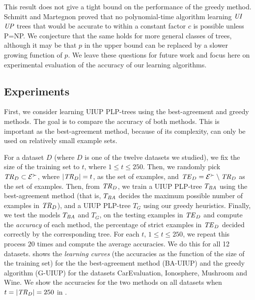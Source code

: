 This result does not give a tight bound on the performance of the greedy 
method. Schmitt and Martegnon \cite{schmitt2006complexity} proved that no
polynomial-time algorithm learning $\textit{UI}$$\textit{UP}$ trees that would be accurate 
to within a constant factor $c$ is possible unless P=NP. We conjecture that
the same holds for more general classes of trees, although it may be that
$p$ in the upper bound can be replaced by a slower growing function of $p$.   
We leave these questions for future work and focus here on experimental
evaluation of the accuracy of our learning algorithms.


\subsection{Experiments}
\label{sec:exp_trees}
First, we consider learning UIUP PLP-trees using the 
best-agreement and greedy methods. The goal is to compare the accuracy of
both methods. This is important as the best-agreement method, because of 
its complexity, can only be used on relatively small example sets. 

For a dataset $D$ (where $D$ is one of the twelve datasets we studied),
we fix the size of the training set to $t$, where $1\leq t\leq 250$. 
Then, we randomly pick $\mathit{TR}_D \subset \mathcal{E}^\succ$, where $|\mathit{TR}_D|=t$, 
as the set of 
 examples, and $\mathit{TE}_D = \mathcal{E}^\succ \setminus \mathit{TR}_D$ as the set 
of  examples. Then, from $\mathit{TR}_D$, we train a UIUP PLP-tree 
$T_{\textit{BA}}$ using the best-agreement method (that is, $T_{\textit{BA}}$ decides the maximum
possible number of examples in $\mathit{TR}_D$), and a UIUP PLP-tree $T_G$ using 
our greedy heuristics. Finally, we test the models $T_{\textit{BA}}$ and $T_G$, on the testing examples in 
$\mathit{TE}_D$ and compute the \emph{accuracy} of each method, the percentage of 
strict examples in $\mathit{TE}_D$ decided correctly by the corresponding tree. 
For each $t$, $1\leq t\leq 250$, we repeat this process $20$ times and 
compute the average accuracies. We do this for all 12 datasets. 
 shows the \emph{learning curves} (the accuracies as the function of the
size of the training set) for the the best-agreement method (BA-UIUP)
and the greedy algorithm (G-UIUP)
for the datasets CarEvaluation, Ionosphere, Mushroom and Wine. 
We show the accuracies for the two methods on all datasets when 
$t=|\mathit{TR}_D|=250$ in .

